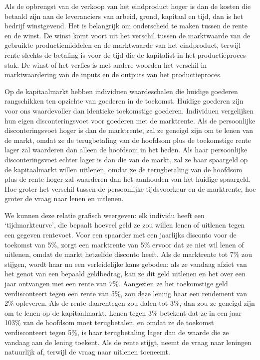\documentclass[
  a5paper,
  smalldemyvopaper,11pt,twoside,onecolumn,openright,extrafontsizes,
hidelinks]{memoir}
\begin{document}
Als de opbrengst van de verkoop van het eindproduct hoger is dan de
kosten die betaald zijn aan de leveranciers van arbeid, grond, kapitaal
en tijd, dan is het bedrijf winstgevend. Het is belangrijk om
onderscheid te maken tussen de rente en de winst. De winst komt voort
uit het verschil tussen de marktwaarde van de gebruikte
productiemiddelen en de marktwaarde van het eindproduct, terwijl rente
slechts de betaling is voor de tijd die de kapitalist in het
productieproces stak. De winst of het verlies is met andere woorden het
verschil in marktwaardering van de inputs en de outputs van het
productieproces.

Op de kapitaalmarkt hebben individuen waardeschalen die huidige goederen
rangschikken ten opzichte van goederen in de toekomst. Huidige goederen
zijn voor ons waardevoller dan identieke toekomstige goederen.
Individuen vergelijken hun eigen disconteringsvoet voor goederen met de
marktrente. Als de persoonlijke disconteringsvoet hoger is dan de
marktrente, zal ze geneigd zijn om te lenen van de markt, omdat ze de
terugbetaling van de hoofdsom plus de toekomstige rente lager zal
waarderen dan alleen de hoofdsom in het heden. Als haar persoonlijke
disconteringsvoet echter lager is dan die van de markt, zal ze haar
spaargeld op de kapitaalmarkt willen uitlenen, omdat ze de terugbetaling
van de hoofdsom plus de rente hoger zal waarderen dan het aanhouden van
het huidige spaargeld. Hoe groter het verschil tussen de persoonlijke
tijdsvoorkeur en de marktrente, hoe groter de vraag naar lenen en
uitlenen.

We kunnen deze relatie grafisch weergeven: elk individu heeft een
`tijdmarktcurve', die bepaalt hoeveel geld ze zou willen lenen of
uitlenen tegen een gegeven rentevoet. Voor een spaarder met een
jaarlijks disconto voor de toekomst van 5\%, zorgt een marktrente van
5\% ervoor dat ze niet wil lenen of uitlenen, omdat de markt hetzelfde
disconto heeft. Als de marktrente tot 7\% zou stijgen, wordt haar nu een
verleidelijke kans geboden: als ze vandaag afziet van het genot van een
bepaald geldbedrag, kan ze dit geld uitlenen en het over een jaar
ontvangen met een rente van 7\%. Aangezien ze het toekomstige geld
verdisconteert tegen een rente van 5\%, zou deze lening haar een
rendement van 2\% opleveren. Als de rente daarentegen zou dalen tot 3\%,
dan zou ze geneigd zijn om te lenen op de kapitaalmarkt. Lenen tegen 3\%
betekent dat ze in een jaar 103\% van de hoofdsom moet terugbetalen, en
omdat ze de toekomst verdisconteert tegen 5\%, is haar terugbetaling
lager dan de waarde die ze vandaag aan de lening toekent. Als de rente
stijgt, neemt de vraag naar leningen natuurlijk af, terwijl de vraag
naar uitlenen toeneemt.
\end{document}
